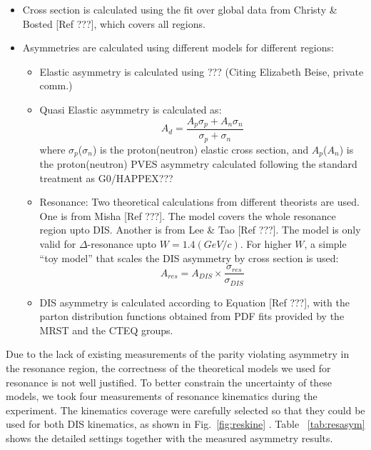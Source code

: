 \begin{itemize}
\item Cross section is calculated using the fit over global data from
  Christy \& Bosted [Ref ???], which covers all regions.

\item Asymmetries are calculated using different models for different
  regions: 
  \begin{itemize}
  \item Elastic asymmetry is calculated using ??? (Citing Elizabeth
    Beise, private comm.)

  \item Quasi Elastic asymmetry is calculated as: 
    \begin{equation}
      A_d = \frac {A_p\sigma_p + A_n\sigma_n}{\sigma_p + \sigma_n}
    \end{equation}
    where $\sigma_p$($\sigma_n$) is the proton(neutron) elastic cross
    section, and $A_p$($A_n$) is the proton(neutron) PVES asymmetry calculated
    following the standard treatment as G0/HAPPEX???

  \item Resonance: Two theoretical calculations from different
    theorists are used. One is from Misha [Ref ???]. The model covers
    the whole resonance region upto DIS. Another is from Lee \& Tao
    [Ref ???]. The model is only valid for $\Delta$-resonance upto
    $W=1.4(GeV/c)$. For higher $W$, a simple ``toy model'' that scales
    the DIS asymmetry by cross section is used:
    \begin{equation}
    A_{res}=A_{DIS}\times \frac {\sigma_{res}}{\sigma_{DIS}}   
    \end{equation}    


  \item DIS asymmetry is calculated according to Equation [Ref ???],
    with the parton distribution functions obtained from PDF fits
    provided by the MRST and the CTEQ groups.

  \end{itemize}

\end{itemize}

Due to the lack of existing measurements of the parity violating
asymmetry in the resonance region, the correctness of the theoretical
models we used for resonance is not well justified. To better
constrain the uncertainty of these models, we took four measurements
of resonance kinematics during the experiment. The kinematics coverage
were carefully selected so that they could be used for both DIS
kinematics, as shown in Fig.~\ref{fig:reskine} . Table ~\ref{tab:resasym} shows the detailed settings
together with the measured asymmetry results. 

